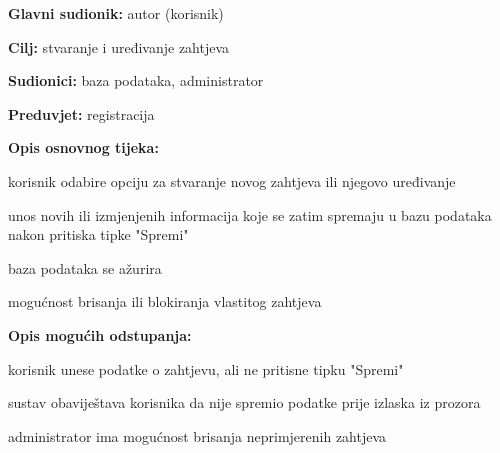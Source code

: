 \noindent {}
\begin{packed_item}
	
	\item \textbf{Glavni sudionik: } autor (korisnik)
	\item  \textbf{Cilj:} stvaranje i uređivanje zahtjeva
	\item  \textbf{Sudionici:} baza podataka, administrator
	\item  \textbf{Preduvjet:} registracija
	\item  \textbf{Opis osnovnog tijeka:}
	
	\item[] \begin{packed_enum}
		
		\item korisnik odabire opciju za stvaranje novog zahtjeva ili njegovo uređivanje
		\item unos novih ili izmjenjenih informacija koje se zatim spremaju u bazu podataka nakon pritiska tipke "Spremi"
		\item baza podataka se ažurira
		\item mogućnost brisanja ili blokiranja vlastitog zahtjeva
	\end{packed_enum}
	
	\item  \textbf{Opis mogućih odstupanja:}
	
	\item[] \begin{packed_item}
		
		\item[2.a] korisnik unese podatke o zahtjevu, ali ne pritisne tipku "Spremi"
		\item[] \begin{packed_enum}
			
			\item sustav obaviještava korisnika da nije spremio podatke prije izlaska iz prozora
			
		\end{packed_enum}
		\item[5] administrator ima mogućnost brisanja neprimjerenih zahtjeva 
		
		
		
	\end{packed_item}
\end{packed_item}
\noindent {}
